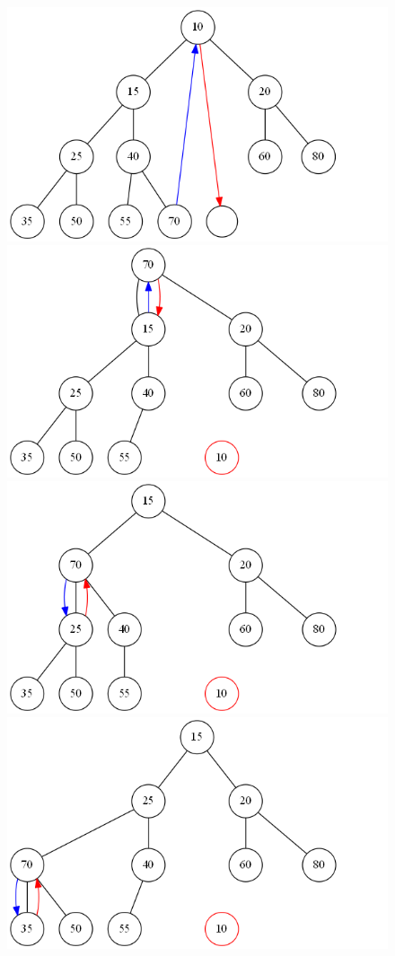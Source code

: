 \documentclass[11pt,a4paper]{amsart}
\theoremstyle{plain}
\numberwithin{equation}{section}
\begin{document}
\begin{figure}[h] \label{fig:png}
\centering
\includegraphics[scale=0.3]{delete1}
\includegraphics[scale=0.3]{delete2}
\includegraphics[scale=0.3]{delete3}
\includegraphics[scale=0.3]{delete4}

\end{figure}
\end{document}
